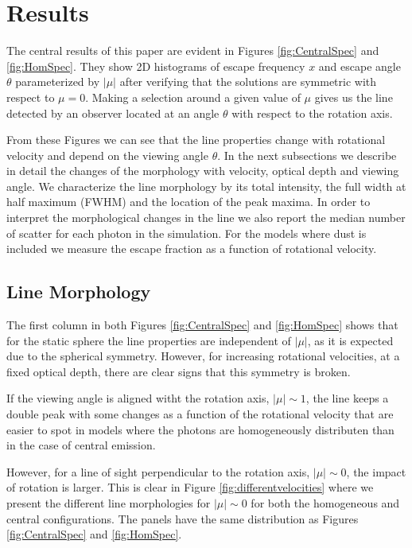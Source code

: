 \documentclass{emulateapj}
\newcommand{\ly}{{\ifmmode{{\rm Ly}\alpha~}\else{Ly$\alpha$~}\fi}}
\begin{document}
\section{Results}
\label{sec:results}

The central results of this paper are evident in Figures
\ref{fig:CentralSpec} and \ref{fig:HomSpec}. They show 2D histograms
of escape frequency $x$ and escape angle $\theta$ parameterized by
$|\mu|$ after verifying that the solutions are symmetric with respect to
$\mu=0$.  Making a selection around a given value of $\mu$ gives us the
line detected by an observer located at an angle $\theta$ with respect
to the rotation axis.


From these Figures we can see that the line properties change with
rotational velocity and depend on the viewing angle $\theta$.  In the
next subsections we describe in  detail the changes of the morphology
with velocity, optical depth and viewing angle. We characterize the
line morphology by its total intensity, the full width at half maximum
(FWHM) and the location of the peak maxima. In order to interpret the
morphological changes in the line we also report the median number of
scatter for each \ly photon in the simulation. For the models where
dust is included we measure the escape fraction as a function of
rotational velocity.  

\subsection{Line Morphology}
\label{sec:angles}

The first column in both Figures \ref{fig:CentralSpec} and
\ref{fig:HomSpec} shows that for the static sphere the line properties
are independent of $|\mu|$, as it is expected due
to the spherical symmetry. However, for increasing rotational
velocities, at a fixed optical depth, there are clear signs that this
symmetry is broken. 

If the viewing angle is aligned witht the rotation axis, $|\mu|\sim
1$, the \ly line keeps a double peak with some changes as a function
of the rotational velocity that are easier to spot in models where the
\ly photons are homogeneously distributen than in the case of central
emission. 

However, for a line of sight perpendicular to the rotation
axis, $|\mu|\sim 0$, the impact of rotation is larger.  This is clear
in  Figure \ref{fig:differentvelocities} where we present the
different line morphologies for $|\mu|\sim 0$ for both the homogeneous
and central configurations. The panels have the same distribution as
Figures \ref{fig:CentralSpec} and \ref{fig:HomSpec}.  
\end{document}
